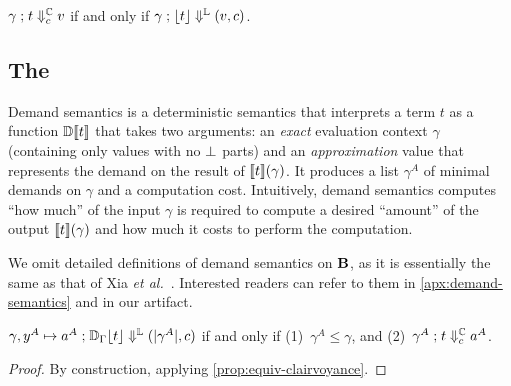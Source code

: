 \begin{theorem}\label{prop:equiv-clairvoyance}
  \( {{\gamma} \mathrel{;} {t}} \Downarrow^{\mathbb{C}}_{c} {v} \) if and only if \( {{\gamma} \mathrel{;} {\lfloor t\rfloor}} \Downarrow^{\mathbb{L}} {(v, c)} \).
\end{theorem}


%

\subsection{The \transDname{}}\label{subsec:values}

Demand semantics is a deterministic semantics that interprets a term \( t \) as
a function \( \mathbb{D}\llbracket t\rrbracket \) that takes two arguments: an \emph{exact} evaluation
context \( \gamma \) (containing only values with no \(\bot\) parts) and
an \emph{approximation} value that represents the demand on the result of
\( \llbracket t\rrbracket({\gamma}) \). It produces a list \(\gamma^A\) of minimal demands on
\(\gamma\) and a computation cost. Intuitively, demand semantics computes ``how
much'' of the input \( \gamma \) is required to compute a desired ``amount'' of
the output \( \llbracket t\rrbracket({\gamma}) \) and how much it costs to perform the
computation.

We omit detailed definitions of demand semantics on \(\mathbf{B}\), as it is
essentially the same as that of Xia \textit{et al.}~\cite{demand-semantics}.
Interested readers can refer to them in \cref{apx:demand-semantics} and in our
artifact.

\ifextended
{}
\fi

\begin{lemma}\label{prop:dem-trans-sem}
  \( {{\gamma, y^A \mapsto a^A} \mathrel{;} {\mathbb{D}_{\Gamma}\lfloor t\rfloor}} \Downarrow^{\mathbb{L}} {(\lvert\gamma^A\rvert, c)} \)
  if and only if (1)~\( \gamma^A \le \gamma \), and
  (2)~\( {{\gamma^A} \mathrel{;} {t}} \Downarrow^{\mathbb{C}}_{c} {a^A} \).
\end{lemma}
\begin{proof}
  By construction, applying \cref{prop:equiv-clairvoyance}.
\end{proof}

